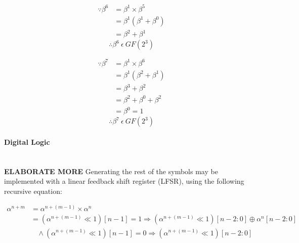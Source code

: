 \documentclass[11pt]{extarticle}
\begin{document}
                \begin{equation*}
                    \begin{split}
                        \because \beta^{6} & = \beta^{1} \times \beta^{5} \\ &
                        =
                        \beta^{1} (\beta^{1}+\beta^{0}) \\ & =
                        \beta^{2}+\beta^{1}
                    \end{split}
                \end{equation*}
                \[ \therefore \beta^{6} \ \epsilon \ GF(2^{3}) \]

                \begin{equation*}
                    \begin{split}
                        \because \beta^{7} & = \beta^{1} \times \beta^{6} \\ &
                        =
                        \beta^{1} (\beta^{2}+\beta^{1}) \\ & =
                        \beta^{3}+\beta^{2}
                        \\ & = \beta^{2}+\beta^{0}+\beta^{2} \\ & = \beta^{0} =
                        1
                    \end{split}
                \end{equation*}
                \[ \therefore \beta^{7} \ \epsilon \ GF(2^{3}) \]

                \paragraph{Digital Logic} \leavevmode \\ \textbf{ELABORATE MORE} Generating the rest of
                the symbols may be implemented with a linear feedback shift
                register (LFSR), using the following recursive equation:

                \begin{equation*}
                    \begin{split}
                        \alpha^{n+m} & =\alpha^{n+(m-1)}\times \alpha^{n} \\ &
                        = (\alpha^{n+(m-1)} \ll 1 )[n-1] = 1 \Longrightarrow (
                        \alpha^{n+(m-1)} \ll 1 )[n-2:0] \oplus
                        \alpha^{n}[n-2:0] \\ & \ \ \ \ \wedge (\alpha^{n+(m-1)}
                        \ll 1 )[n-1] = 0 \Longrightarrow ( \alpha^{n+(m-1)} \ll
                        1 )[n-2:0] \\
                    \end{split}
                \end{equation*}
\end{document}
